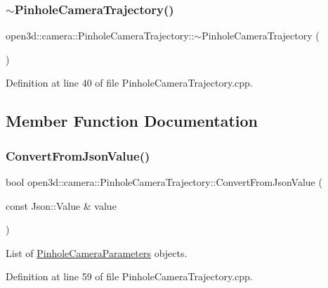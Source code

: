 \subsubsection{\texorpdfstring{$\sim$PinholeCameraTrajectory()}{~PinholeCameraTrajectory()}}
{\footnotesize\ttfamily open3d\+::camera\+::\+Pinhole\+Camera\+Trajectory\+::$\sim$\+Pinhole\+Camera\+Trajectory (\begin{DoxyParamCaption}{ }\end{DoxyParamCaption})\hspace{0.3cm}{\ttfamily [override]}}



Definition at line 40 of file Pinhole\+Camera\+Trajectory.\+cpp.



\subsection{Member Function Documentation}
\mbox{\label{classopen3d_1_1camera_1_1_pinhole_camera_trajectory_ad1cecdbbb56375e5b67ea1acc02c21d8}} 
\subsubsection{\texorpdfstring{ConvertFromJsonValue()}{ConvertFromJsonValue()}}
{\footnotesize\ttfamily bool open3d\+::camera\+::\+Pinhole\+Camera\+Trajectory\+::\+Convert\+From\+Json\+Value (\begin{DoxyParamCaption}\item[{const Json\+::\+Value \&}]{value }\end{DoxyParamCaption})\hspace{0.3cm}{\ttfamily [override]}}



List of \mbox{\hyperlink{classopen3d_1_1camera_1_1_pinhole_camera_parameters}{Pinhole\+Camera\+Parameters}} objects. 



Definition at line 59 of file Pinhole\+Camera\+Trajectory.\+cpp.

\mbox{\label{classopen3d_1_1camera_1_1_pinhole_camera_trajectory_af54b7e957f918c9d577ef5d93acbcde3}} 
